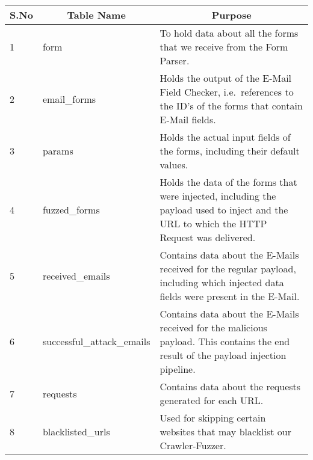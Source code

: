 \begin{tabular}{|p{1cm}|p{5cm}|p{8cm}|}
	\hline
	\multicolumn{1}{|c|}{\textbf{S.No}} & \multicolumn{1}{c}{\textbf{Table Name}} & 
	\multicolumn{1}{|c|}{\textbf{Purpose}}\\
	\hline
	1 & form & To hold data about all the forms that we receive from the Form Parser.\\
	\hline
	2 & {{email\_forms}} & Holds the output of the E-Mail Field Checker, i.e.\ references to the ID's of the forms that contain E-Mail fields. \\
	\hline
	3 & params & Holds the actual input fields of the forms, including their default values.\\
	\hline
	4 & {{fuzzed\_forms}} & Holds the data of the forms that were injected, including the payload used to inject and the URL to which the HTTP Request was delivered.\\
	\hline
	5 & {{received\_emails}} & Contains data about the E-Mails received for the regular payload, including which injected data fields were present in the E-Mail.\\
	\hline
	6 & {{successful\_attack\_emails}} & Contains data about the E-Mails received for the malicious payload. This contains the end result of the payload injection pipeline.\\
	\hline
	7 & requests & Contains data about the requests generated for each URL.\\
	\hline
	8 & {{blacklisted\_urls}} & Used for skipping certain websites that may blacklist our Crawler-Fuzzer.\\
	\hline
\end{tabular}
